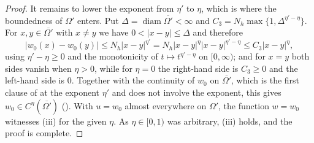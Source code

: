 \begin{proof}
It remains to lower the exponent from $\eta'$ to $\eta$, which is where the
boundedness of $\Omega'$ enters.  Put
$\Delta=\operatorname{diam}\overline{\Omega'}<\infty$ and
$C_3=N_h\max\{1,\Delta^{\eta'-\eta}\}$.  For $x,y\in\overline{\Omega'}$ with
$x\ne y$ we have $0<|x-y|\le\Delta$ and therefore
\[
|w_0(x)-w_0(y)|\le N_h|x-y|^{\eta'}
=N_h|x-y|^{\eta}|x-y|^{\eta'-\eta}\le C_3|x-y|^{\eta},
\]
using $\eta'-\eta\ge0$ and the monotonicity of $t\mapsto t^{\eta'-\eta}$ on
$[0,\infty)$; and for $x=y$ both sides vanish when $\eta>0$, while for $\eta=0$
the right-hand side is $C_3\ge0$ and the left-hand side is $0$.  Together with
the continuity of $w_0$ on $\overline{\Omega'}$, which is the first clause of
 at the exponent $\eta'$ and does not involve the exponent,
this gives $w_0\in C^{\eta}(\overline{\Omega'})$ ().  With
$u=w_0$ almost everywhere on $\Omega'$, the function $w=w_0$ witnesses (iii) for
the given $\eta$.  As $\eta\in[0,1)$ was arbitrary, (iii) holds, and the proof
is complete.
\end{proof}
